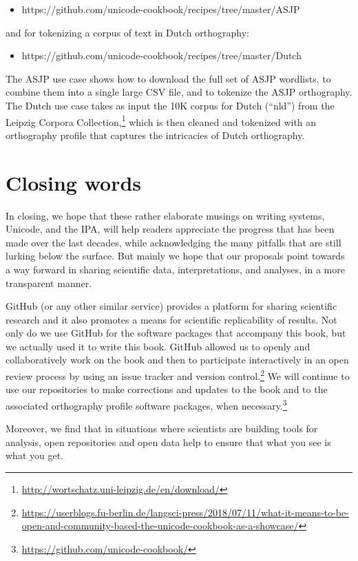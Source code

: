 \documentclass[output=book,nonflat,modfonts,
citecolor=brown,
		]{langsci/langscibook}\usepackage[]{graphicx}\usepackage[]{color}
\begin{document}
\begin{itemize}
	\item https://github.com/unicode-cookbook/recipes/tree/master/ASJP
\end{itemize}

\noindent and for tokenizing a corpus of text in Dutch orthography:

\begin{itemize}
	\item https://github.com/unicode-cookbook/recipes/tree/master/Dutch
\end{itemize}

\noindent The ASJP use case shows how to download the full set of ASJP wordlists, to combine them into a single large CSV file, and to tokenize the ASJP orthography. The Dutch use case takes as input the 10K corpus for Dutch (``nld'') from the Leipzig Corpora Collection,\footnote{\url{http://wortschatz.uni-leipzig.de/en/download/}} which is then cleaned and tokenized with an orthography profile that captures the intricacies of Dutch orthography.

\section{Closing words}

In closing, we hope that these rather elaborate musings on writing systems, Unicode, and the IPA, will help readers appreciate the progress that has been made over the last decades, while acknowledging the many pitfalls that are still lurking below the surface. But mainly we hope that our proposals point towards a way forward in sharing scientific data, interpretations, and analyses, in a more transparent manner.

GitHub (or any other similar service) provides a platform for sharing scientific research and it also promotes a means for scientific replicability of results. Not only do we use GitHub for the software packages that accompany this book, but we actually used it to write this book. GitHub allowed us to openly and collaboratively work on the book and then to participate interactively in an open review process by using an issue tracker and version control.\footnote{\url{https://userblogs.fu-berlin.de/langsci-press/2018/07/11/what-it-means-to-be-open-and-community-based-the-unicode-cookbook-as-a-showcase/}} We will continue to use our repositories to make corrections and updates to the book and to the associated orthography profile software packages, when necessary.\footnote{\url{https://github.com/unicode-cookbook/}}

Moreover, we find that in situations where scientists are building tools for analysis, open repositories and open data help to ensure that what you see is what you get.

% 




\end{document}
